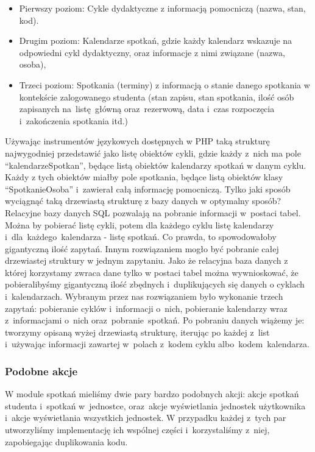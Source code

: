 \documentclass[licencjacka]{pracamgr}
\begin{document}
\begin{itemize}
\item{Pierwszy poziom: Cykle dydaktyczne z informacją pomocniczą (nazwa, stan, kod).}
\item{Drugim poziom: Kalendarze spotkań, gdzie każdy kalendarz wskazuje na odpowiedni cykl dydaktyczny, oraz informacje z nimi związane (nazwa, osoba),}
\item{Trzeci poziom: Spotkania (terminy) z informacją o stanie danego spotkania w kontekście zalogowanego studenta (stan zapisu, stan spotkania, ilość osób zapisanych na~listę~główną oraz~rezerwową, data i~czas rozpoczęcia i~zakończenia spotkania itd.)}
\end{itemize}
Używając instrumentów językowych dostępnych w PHP taką strukturę najwygodniej przedstawić jako listę obiektów cykli, gdzie każdy z~nich ma pole \enquote{kalendarzeSpotkan}, będące listą obiektów kalendarzy spotkań w danym cyklu. Każdy z tych obiektów miałby pole spotkania, będące listą obiektów klasy \enquote{SpotkanieOsoba} i~zawierał całą informację pomocniczą. 
Tylko jaki sposób wyciągnąć taką drzewiastą strukturę z bazy danych w optymalny sposób? Relacyjne bazy danych SQL pozwalają na pobranie informacji w~postaci tabel. Można by pobierać listę cykli, potem dla każdego cyklu listę kalendarzy i~dla~każdego~kalendarza - listę spotkań. Co prawda, to spowodowałoby gigantyczną ilość zapytań. Innym rozwiązaniem mogło być pobranie całej drzewiastej struktury w jednym zapytaniu. Jako że relacyjna baza danych z której korzystamy zwraca dane tylko w postaci tabel można wywnioskować, że pobieralibyśmy gigantyczną ilość zbędnych i~duplikujących się danych o cyklach i~kalendarzach. Wybranym przez nas rozwiązaniem było wykonanie trzech zapytań: pobieranie cyklów i~informacji o~nich, pobieranie kalendarzy wraz z~informacjami o~nich oraz~pobranie~spotkań. Po pobraniu danych wiążemy je: tworzymy opisaną wyżej drzewiastą strukturę, iterując po każdej z~list i~używając informacji zawartej w~polach z~kodem cyklu albo~kodem~kalendarza.

\subsubsection{Podobne akcje}
W module spotkań mieliśmy dwie pary bardzo podobnych akcji: akcje spotkań studenta i~spotkań w~jednostce, oraz~akcje wyświetlania jednostek użytkownika i~akcje wyświetlania wszystkich jednostek. W przypadku każdej z~tych par utworzyliśmy implementację ich wspólnej części i~korzystaliśmy z~niej, zapobiegając duplikowania kodu.
\end{document}
